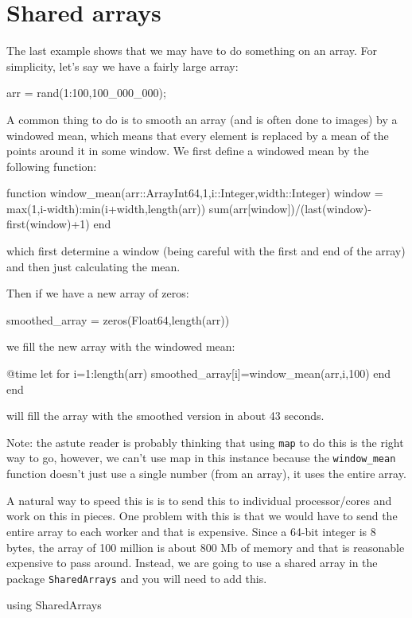 \section{Shared arrays}

The last example shows that we may have to do something on an array. For
simplicity, let's say we have a fairly large array:

\begin{jlverbatim}
arr = rand(1:100,100_000_000);
\end{jlverbatim}

A common thing to do is to smooth an array (and is often done to images)
by a windowed mean, which means that every element is replaced by a mean
of the points around it in some window. We first define a windowed mean
by the following function:

\begin{jlverbatim}
function window_mean(arr::Array{Int64,1},i::Integer,width::Integer)
  window = max(1,i-width):min(i+width,length(arr))
  sum(arr[window])/(last(window)-first(window)+1)
end
\end{jlverbatim}

which first determine a window (being careful with the first and end of
the array) and then just calculating the mean.

Then if we have a new array of zeros:

\begin{jlverbatim}
smoothed_array = zeros(Float64,length(arr))
\end{jlverbatim}

we fill the new array with the windowed mean:

\begin{jlverbatim}
@time let
  for i=1:length(arr)
    smoothed_array[i]=window_mean(arr,i,100)
  end
end
\end{jlverbatim}

will fill the array with the smoothed version in about 43 seconds.

Note: the astute reader is probably thinking that using \texttt{map} to
do this is the right way to go, however, we can't use map in this
instance because the \texttt{window\_mean} function doesn't just use a
single number (from an array), it uses the entire array.

A natural way to speed this is is to send this to individual
processor/cores and work on this in pieces. One problem with this is
that we would have to send the entire array to each worker and that is
expensive. Since a 64-bit integer is 8 bytes, the array of 100 million
is about 800 Mb of memory and that is reasonable expensive to pass
around. Instead, we are going to use a shared array in the package
\texttt{SharedArrays} and you will need to add this.

\begin{jlverbatim}
using SharedArrays
\end{jlverbatim}
